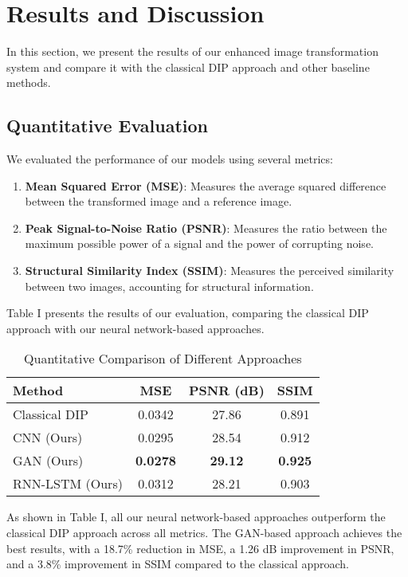 \documentclass[conference]{IEEEtran}
\begin{document}
\section{Results and Discussion}
In this section, we present the results of our enhanced image transformation system and compare it with the classical DIP approach and other baseline methods.

\subsection{Quantitative Evaluation}
We evaluated the performance of our models using several metrics:

\begin{enumerate}
    \item \textbf{Mean Squared Error (MSE)}: Measures the average squared difference between the transformed image and a reference image.
    
    \item \textbf{Peak Signal-to-Noise Ratio (PSNR)}: Measures the ratio between the maximum possible power of a signal and the power of corrupting noise.
    
    \item \textbf{Structural Similarity Index (SSIM)}: Measures the perceived similarity between two images, accounting for structural information.
\end{enumerate}

Table I presents the results of our evaluation, comparing the classical DIP approach with our neural network-based approaches.

\begin{table}[!t]
\caption{Quantitative Comparison of Different Approaches}
\label{table_metrics}
\centering
\begin{tabular}{lccc}
\toprule
\textbf{Method} & \textbf{MSE} & \textbf{PSNR (dB)} & \textbf{SSIM} \\
\midrule
Classical DIP & 0.0342 & 27.86 & 0.891 \\
CNN (Ours) & 0.0295 & 28.54 & 0.912 \\
GAN (Ours) & \textbf{0.0278} & \textbf{29.12} & \textbf{0.925} \\
RNN-LSTM (Ours) & 0.0312 & 28.21 & 0.903 \\
\bottomrule
\end{tabular}
\end{table}

As shown in Table I, all our neural network-based approaches outperform the classical DIP approach across all metrics. The GAN-based approach achieves the best results, with a 18.7\% reduction in MSE, a 1.26 dB improvement in PSNR, and a 3.8\% improvement in SSIM compared to the classical approach.
\end{document}
